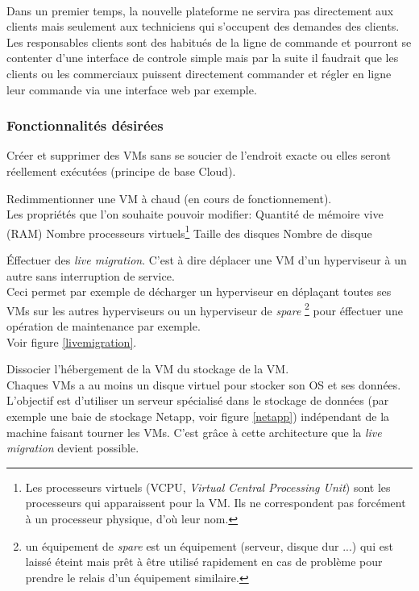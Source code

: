 \paragraph*{}
Dans un premier temps, la nouvelle plateforme ne servira pas directement aux clients mais seulement aux techniciens  qui s'occupent des
demandes des clients.\\
Les responsables clients sont des habitués de la ligne de commande et pourront se contenter d'une interface de controle simple mais par la suite
il faudrait que les clients ou les commerciaux puissent directement commander et régler en ligne leur commande via une interface web par exemple.

\subsubsection{Fonctionnalités désirées}

\begin{listi}
	\item Créer et supprimer des VMs sans se soucier de l'endroit exacte ou elles seront réellement exécutées (principe de base Cloud).
	\item Redimmentionner une VM à chaud (en cours de fonctionnement).\\
		Les propriétés que l'on souhaite pouvoir modifier:
		\subitem Quantité de mémoire vive (RAM)
		\subitem Nombre processeurs virtuels\footnote{Les processeurs virtuels (VCPU, \emph{Virtual Central Processing Unit}) sont les processeurs qui apparaissent
			pour la VM. Ils ne correspondent pas forcément à un processeur physique, d'où leur nom.}
		\subitem Taille des disques
		\subitem Nombre de disque
	\item Éffectuer des \emph{live migration}. C'est à dire déplacer une VM d'un hyperviseur à un autre sans interruption de service.\\
		Ceci permet par exemple de décharger un hyperviseur en déplaçant toutes ses VMs sur les autres hyperviseurs ou un hyperviseur de \emph{spare}
		\footnote{un équipement de \emph{spare} est un équipement (serveur, disque dur ...) qui est laissé éteint mais prêt à être utilisé rapidement
		en cas de problème pour prendre le relais d'un équipement similaire.} pour éffectuer une opération de maintenance par exemple.
		\\
		Voir figure \ref{livemigration}.
	\item Dissocier l'hébergement de la VM du stockage de la VM.\\
		Chaques VMs a au moins un disque virtuel pour stocker son OS et ses données. L'objectif est d'utiliser un serveur spécialisé dans le stockage de données
		(par exemple une baie de stockage Netapp, voir figure \ref{netapp}) indépendant de la machine faisant tourner les VMs. C'est grâce à cette architecture que
		la \emph{live migration} devient possible.
\end{listi}

